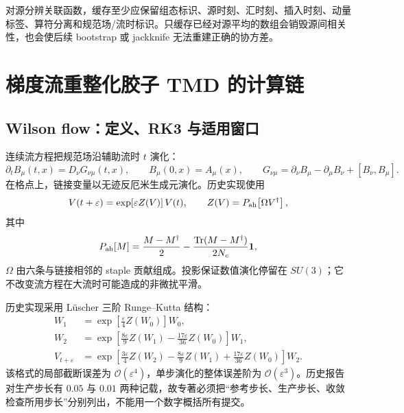 对源分辨关联函数，缓存至少应保留组态标识、源时刻、汇时刻、插入时刻、动量标签、算符分离和规范场/流时标识。只缓存已经对源平均的数组会销毁源间相关性，也会使后续 bootstrap 或 jackknife 无法重建正确的协方差。

\chapter{梯度流重整化胶子 TMD 的计算链}

\section{Wilson flow：定义、RK3 与适用窗口}

连续流方程把规范场沿辅助流时 $t$ 演化：
\begin{equation}
  \partial_t B_\mu(t,x)=D_\nu G_{\nu\mu}(t,x),
  \qquad B_\mu(0,x)=A_\mu(x),
  \qquad G_{\nu\mu}=\partial_\nu B_\mu-\partial_\mu B_\nu+[B_\nu,B_\mu].
  \label{eq:b07-flow}
\end{equation}
在格点上，链接变量以无迹反厄米生成元演化。历史实现使用
\begin{equation}
  V(t+\varepsilon)=\exp\!\left[\varepsilon Z(V)\right]V(t),
  \qquad
  Z(V)=P_{\rm ah}\!\left[\Omega V^\dagger\right],
  \label{eq:b07-flowstep}
\end{equation}
其中
\begin{equation}
  P_{\rm ah}[M]=\frac{M-M^\dagger}{2}
  -\frac{\operatorname{Tr}(M-M^\dagger)}{2N_c}\mathbf 1,
  \label{eq:b07-ah}
\end{equation}
$\Omega$ 由六条与链接相邻的 staple 贡献组成。投影保证数值演化停留在 $SU(3)$；它不改变流方程在大流时可能造成的非微扰平滑。

历史实现采用 Lüscher 三阶 Runge--Kutta 结构：
\begin{align}
  W_1&=\exp\!\left[\frac{\varepsilon}{4}Z(W_0)\right]W_0,\nonumber\\
  W_2&=\exp\!\left[\frac{8\varepsilon}{9}Z(W_1)-\frac{17\varepsilon}{36}Z(W_0)\right]W_1,\nonumber\\
  V_{t+\varepsilon}&=\exp\!\left[\frac{3\varepsilon}{4}Z(W_2)
  -\frac{8\varepsilon}{9}Z(W_1)+\frac{17\varepsilon}{36}Z(W_0)\right]W_2.
  \label{eq:b07-rk3}
\end{align}
该格式的局部截断误差为 $\mathcal O(\varepsilon^4)$，单步演化的整体误差阶为 $\mathcal O(\varepsilon^3)$。历史报告对生产步长有 $0.05$ 与 $0.01$ 两种记载，故专著必须把“参考步长、生产步长、收敛检查所用步长”分别列出，不能用一个数字概括所有提交。

